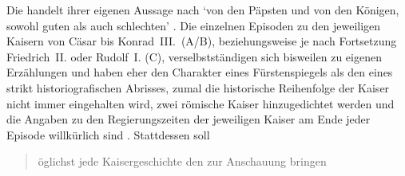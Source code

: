 
Die \KC{} handelt ihrer eigenen Aussage nach
`von den Päpsten und von den Königen, sowohl guten als auch schlechten'
\autocite[19--20]{schroeder1895}. Die einzelnen Episoden zu den jeweiligen
Kaisern von Cäsar bis Konrad~III.\ (A/B), beziehungsweise je nach Fortsetzung
Friedrich~II. oder Rudolf~I. (C), verselbstständigen sich bisweilen zu eigenen
Erzählungen und haben eher den Charakter eines Fürstenspiegels als den eines
strikt historiografischen Abrisses, zumal die historische Reihenfolge der
Kaiser nicht immer eingehalten wird, zwei römische Kaiser hinzugedichtet werden
und die Angaben zu den Regierungszeiten der jeweiligen Kaiser am Ende jeder
Episode willkürlich sind \autocite[954--960]{nellmann1983}. Stattdessen soll
\blockcquote[957]{nellmann1983}{öglichst jede Kaisergeschichte
\textelp{} den  \textelp{}
zur Anschauung bringen}.

